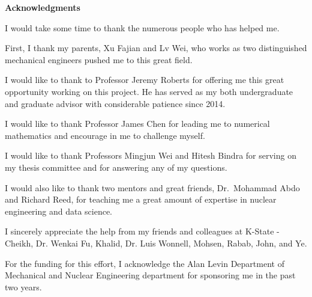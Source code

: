 
\newpage
\vspace*{0.9cm}
\begin{center}
{\bf \Huge Acknowledgments}
\end{center}

\setlength{\baselineskip}{0.8cm}


I would take some time to thank the numerous people who has helped me.

First, I thank my parents, Xu Fajian and Lv Wei, who works as two distinguished mechanical engineers pushed me to this great field.

I would like to thank to Professor Jeremy Roberts for offering me this great opportunity working on this project. He has served as my both undergraduate and graduate advisor with considerable patience since 2014.

I would like to thank Professor James Chen for leading me to numerical mathematics and encourage in me to challenge myself.   

I would like to thank Professors Mingjun Wei and Hitesh Bindra for serving on my thesis committee and for answering any of my questions.

I would also like to thank two mentors and great friends, Dr.~Mohammad Abdo and Richard Reed, for teaching me a great amount of expertise in nuclear engineering and data science.

I sincerely appreciate the help from my friends and colleagues at K-State - Cheikh, Dr. Wenkai Fu, Khalid, Dr. Luis Wonnell, Mohsen, Rabab, John, and Ye.

For the funding for this effort, I acknowledge the Alan Levin Department of Mechanical and Nuclear Engineering department for sponsoring me in the past two years. 